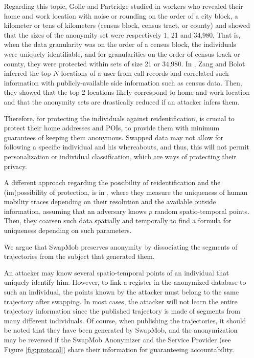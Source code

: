 \documentclass{llncs}
\begin{document}
Regarding this topic, Golle and Partridge studied in \cite{Golle:2009} workers who revealed their home and work location with noise or rounding on the order of a city block, a kilometer or tens of kilometers (census block, census tract, or county) and showed that the sizes of the anonymity set were respectively 1, 21 and 34,980. That is, when the data granularity was on the order of a census block, the individuals were uniquely identifiable, and for granularities on the order of census track or county, they were protected within sets of size 21 or 34,980.
In \cite{Zang:2011},  Zang and Bolot inferred the top $N$ locations of a user from call records and correlated such information with publicly-available side  information such as census data.  Then, they showed that the top 2 locations likely correspond to home and work location and that the anonymity sets are drastically reduced if an attacker infers them.


Therefore, for protecting the individuals against reidentification, is crucial to protect their home addresses and POIs, to provide them with minimum guarantees of keeping them anonymous.
Swapped data may not allow for following a specific individual and his whereabouts, and thus, this will not permit personalization or individual classification, which are ways of protecting their privacy.


A different approach regarding the possibility of reidentification and the (im)possibility of protection, is in \cite{demontjoye2013}, where they measure the uniqueness of human mobility traces depending on their resolution and the available outside information, assuming that an adversary knows $p$ random spatio-temporal points. Then, they coarsen such data spatially and temporally to find a formula for uniqueness depending on such parameters.


We argue that SwapMob preserves anonymity by dissociating the segments of trajectories from the subject that generated them.

An attacker may know several spatio-temporal points of an individual that uniquely identify him. However, to link a register in the anonymized database to such an individual, the points known by the attacker must belong to the same trajectory after swapping. In most cases, the attacker will not learn the entire trajectory information since the published trajectory is made of segments from many different individuals.
Of course, when publishing the trajectories, it should be noted that they have been generated by SwapMob, and the anonymization may be reversed if the SwapMob Anonymizer and the Service Provider (see Figure \ref{fig:protocol}) share their information for guaranteeing accountability.
\end{document}
